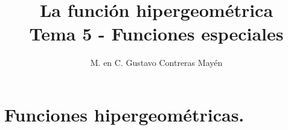 
\usepackage{apacite}
\title{La función hipergeométrica \\ \large {Tema 5 - Funciones especiales} \vspace{-3ex}}
\author{M. en C. Gustavo Contreras Mayén}
\date{ }

\vspace{-4cm}
\maketitle
\fontsize{14}{14}\selectfont
\tableofcontents
\newpage
\section{Funciones hipergeométricas.}

